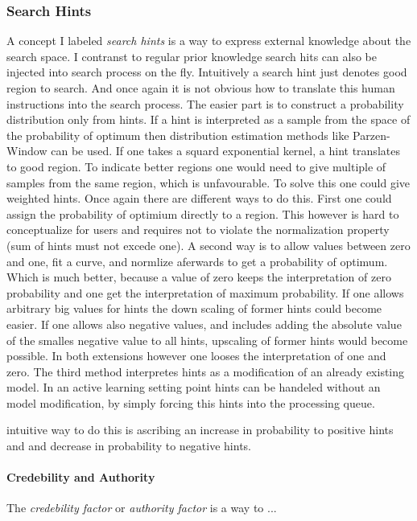 \documentclass[english]{article}
\begin{document}
\subsubsection{Search Hints}
A concept I labeled \textit{search hints} is a way to express external knowledge about the search space. I contranst to regular prior knowledge search hits can also be injected into search process on the fly. Intuitively a search hint just denotes good region to search. And once again it is not obvious how to translate this human instructions into the search process.
The easier part is to construct a probability distribution only from hints. If a hint is interpreted as a sample from the space of the probability of optimum then distribution estimation methods like Parzen-Window can be used. If one takes a squard exponential kernel, a hint translates to good region. To indicate better regions one would need to give multiple of samples from the same region, which is unfavourable. To solve this one could give weighted hints. Once again there are different ways to do this.
First one could assign the probability of optimium directly to a region. This however is hard to conceptualize for users and requires not to violate the normalization property (sum of hints must not excede one).
A second way is to allow values between zero and one, fit a curve, and normlize aferwards to get a probability of optimum. Which is much better, because a value of zero keeps the interpretation of zero probability and one get the interpretation of maximum probability. If one allows arbitrary big values for hints the down scaling of former hints could become easier. If one allows also negative values, and includes adding the absolute value of the smalles negative value to all hints, upscaling of former hints would become possible. In both extensions however one looses the interpretation of one and zero.
The third method interpretes hints as a modification of an already existing model.
In an active learning setting point hints can be handeled without an model modification, by simply forcing this hints into the processing queue.

intuitive way to do this is ascribing an increase in probability to positive hints and and decrease in probability to negative hints.

\paragraph{Credebility and Authority}
The \textit{credebility factor} or \textit{authority factor} is a way to ...
\end{document}
